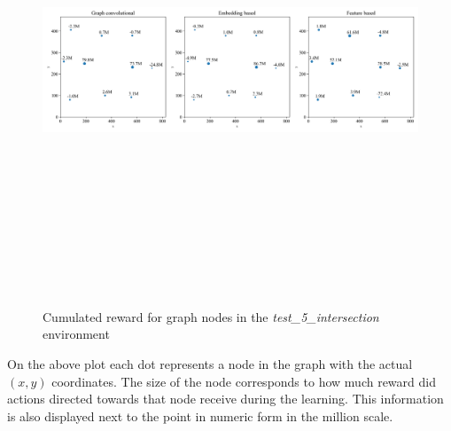 \documentclass[
]{elteikthesis}[2023/04/10]
\begin{document}
\begin{figure}[H]
\begin{centering}
\includegraphics[width=14cm,height=14cm,keepaspectratio]{images/node_reward_plot_node_weights_plot_test_5_intersection}
\par\end{centering}
\caption{Cumulated reward for graph nodes in the \emph{test\_5\_intersection}
environment}
\end{figure}

On the above plot each dot represents a node in the graph with the
actual $(x,y)$ coordinates. The size of the node corresponds to how
much reward did actions directed towards that node receive during
the learning. This information is also displayed next to the point
in numeric form in the million scale. 
\end{document}
